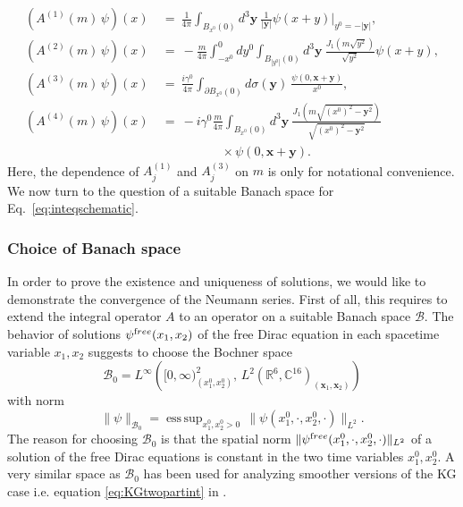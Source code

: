 \documentclass[b5paper,draft,openbib,12pt]{memoir}
\newcommand{\R}{\mathbb{R}}
\newcommand{\CC}{\mathbb{C}}
\newcommand{\vx}{\mathbf{x}}
\newcommand{\vy}{\mathbf{y}}
\newcommand{\free}{{\textup free}}
\newcommand{\Banach}{\mathscr{B}}
\DeclareMathOperator*{\esssup}{ess \, sup}
\begin{document}
\begin{align}
	\left(A^{(1)}(m) \,\psi \right)(x) ~&=~ \frac{1}{4\pi} \int_{B_{x^0}(0)} \! \!d^3 \vy ~ \frac{1}{|\vy|} \psi(x+y)|_{y^0 = -|\vy|}, \label{eq:a1}\\
	\left(A^{(2)}(m) \,\psi\right)(x) ~&=~ -\frac{m}{4\pi} \int_{-x^0}^0 dy^0 \int_{B_{|y^0|}(0)} d^3 \vy ~ \frac{J_1(m\sqrt{y^2})}{\sqrt{y^2}} \psi(x+y),\label{eq:a2}\\
	\left(A^{(3)}(m)\, \psi\right)(x) ~&=~ \frac{i \gamma^0}{4\pi} \int_{\partial B_{x^0}(0)}d\sigma(\vy) ~ \frac{\psi(0,\vx+\vy)}{x^0}, \label{eq:a3}\\\nonumber
  \left(A^{(4)}(m) \, \psi\right)(x) ~&=~ - i \gamma^0 \frac{m}{4\pi} \int_{B_{x^0}(0)}d^3 \vy ~ \frac{J_1(m\sqrt{(x^0)^2 - \vy^2})}{\sqrt{(x^0)^2 - \vy^2}}\\
  &\hspace{2cm} \times\psi(0,\vx+\vy).\label{eq:a4}
\end{align}
Here, the dependence of $A_j^{(1)}$ and $A_j^{(3)}$ on $m$ is only for notational convenience.\\
We now turn to the question of a suitable Banach space for Eq.\ \eqref{eq:inteqschematic}.

\subsubsection{Choice of Banach space} \label{sec:choiceofB}

In order to prove the existence and uniqueness of solutions, we would like to demonstrate the convergence of the Neumann series. First of all, this requires to extend the integral operator $A$ to an operator on a suitable Banach space $\Banach$. The behavior of solutions $\psi^\free(x_1,x_2)$ of the free Dirac equation in each spacetime variable $x_1,x_2$ suggests to choose the Bochner space
\begin{equation}
		\Banach_0 = L^\infty \left([0,\infty)^2_{(x_1^0,x_2^0)}, \,  L^2(\R^6,\CC^{16})_{(\vx_1,\vx_2)}\right)
	\label{eq:banach0}
\end{equation}
with norm
\begin{equation}
	\| \psi \|_{\Banach_0} = \esssup_{x_1^0,x_2^0 > 0} \, \| \psi(x_1^0,\cdot,x_2^0,\cdot)\|_{L^2}.
\end{equation}
The reason for choosing $\Banach_0$ is that the 
spatial norm $\| \psi^\free(x_1^0,\cdot,x_2^0,\cdot)\|_{L^2}$ of 
a solution of the free Dirac equations is constant in the two 
time variables $x_1^0,x_2^0$. A very similar space as 
$\Banach_0$ has been used for analyzing smoother versions of
the KG case i.e. equation 
\eqref{eq:KGtwopartint} in \cite{mtve}.
\end{document}
